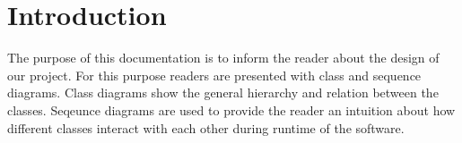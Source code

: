 \section{Introduction}
The purpose of this documentation is to inform the reader about the design of our project. For this purpose readers are presented with class and sequence diagrams. Class diagrams show the general hierarchy and relation between the classes. Seqeunce diagrams are used to provide the reader an intuition about how different classes interact with each other during runtime of the software.